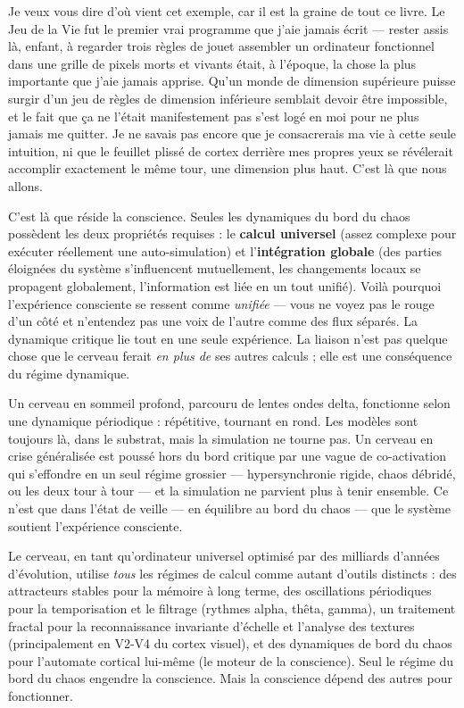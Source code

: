 \documentclass[11pt, twoside, openright]{book}
\begin{document}
Je veux vous dire d'où vient cet exemple, car il est la graine de tout ce livre. Le Jeu de la Vie fut le premier vrai programme que j'aie jamais écrit --- rester assis là, enfant, à regarder trois règles de jouet assembler un ordinateur fonctionnel dans une grille de pixels morts et vivants était, à l'époque, la chose la plus importante que j'aie jamais apprise. Qu'un monde de dimension supérieure puisse surgir d'un jeu de règles de dimension inférieure semblait devoir être impossible, et le fait que ça ne l'était manifestement pas s'est logé en moi pour ne plus jamais me quitter. Je ne savais pas encore que je consacrerais ma vie à cette seule intuition, ni que le feuillet plissé de cortex derrière mes propres yeux se révélerait accomplir exactement le même tour, une dimension plus haut. C'est là que nous allons.

C'est là que réside la conscience. Seules les dynamiques du bord du chaos possèdent les deux propriétés requises : le \textbf{calcul universel} (assez complexe pour exécuter réellement une auto-simulation) et l'\textbf{intégration globale} (des parties éloignées du système s'influencent mutuellement, les changements locaux se propagent globalement, l'information est liée en un tout unifié). Voilà pourquoi l'expérience consciente se ressent comme \textit{unifiée} --- vous ne voyez pas le rouge d'un côté et n'entendez pas une voix de l'autre comme des flux séparés. La dynamique critique lie tout en une seule expérience. La liaison n'est pas quelque chose que le cerveau ferait \textit{en plus de} ses autres calculs ; elle est une conséquence du régime dynamique.

Un cerveau en sommeil profond, parcouru de lentes ondes delta, fonctionne selon une dynamique périodique : répétitive, tournant en rond. Les modèles sont toujours là, dans le substrat, mais la simulation ne tourne pas. Un cerveau en crise généralisée est poussé hors du bord critique par une vague de co-activation qui s'effondre en un seul régime grossier --- hypersynchronie rigide, chaos débridé, ou les deux tour à tour --- et la simulation ne parvient plus à tenir ensemble. Ce n'est que dans l'état de veille --- en équilibre au bord du chaos --- que le système soutient l'expérience consciente.

Le cerveau, en tant qu'ordinateur universel optimisé par des milliards d'années d'évolution, utilise \textit{tous} les régimes de calcul comme autant d'outils distincts : des attracteurs stables pour la mémoire à long terme, des oscillations périodiques pour la temporisation et le filtrage (rythmes alpha, thêta, gamma), un traitement fractal pour la reconnaissance invariante d'échelle et l'analyse des textures (principalement en V2-V4 du cortex visuel), et des dynamiques de bord du chaos pour l'automate cortical lui-même (le moteur de la conscience). Seul le régime du bord du chaos engendre la conscience. Mais la conscience dépend des autres pour fonctionner.
\end{document}
